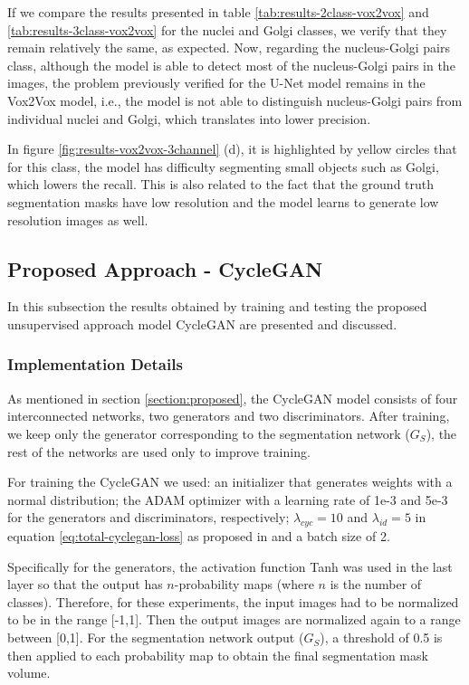 If we compare the results presented in table \ref{tab:results-2class-vox2vox} and \ref{tab:results-3class-vox2vox} for the nuclei and Golgi classes, we verify that they remain relatively the same, as expected. Now, regarding the nucleus-Golgi pairs class, although the model is able to detect most of the nucleus-Golgi pairs in the images, the problem previously verified for the U-Net model remains in the Vox2Vox model, i.e., the model is not able to distinguish nucleus-Golgi pairs from individual nuclei and Golgi, which translates into lower precision. 

In figure \ref{fig:results-vox2vox-3channel} (d), it is highlighted by yellow circles that for this class, the model has difficulty segmenting small objects such as Golgi, which lowers the recall. This is also related to the fact that the ground truth segmentation masks have low resolution and the model learns to generate low resolution images as well.


\subsection{Proposed Approach - CycleGAN}

In this subsection the results obtained by training and testing the proposed unsupervised approach model CycleGAN are presented and discussed.

\subsubsection*{Implementation Details}

As mentioned in section \ref{section:proposed}, the CycleGAN model consists of four interconnected networks, two generators and two discriminators. After training, we keep only the generator corresponding to the segmentation network ($G_S$), the rest of the networks are used only to improve training. 

For training the CycleGAN we used: an initializer that generates weights with a normal distribution; the ADAM optimizer with a learning rate of 1e-3 and 5e-3 for the generators and discriminators, respectively; $\lambda_{cyc} = 10$ and $\lambda_{id} = 5$ in equation \ref{eq:total-cyclegan-loss} as proposed in \cite{cycleGAN:original} and a batch size of 2.

Specifically for the generators, the activation function \ac{Tanh} was used in the last layer so that the output has $n$-probability maps (where $n$ is the number of classes). Therefore, for these experiments, the input images had to be normalized to be in the range [-1,1]. Then the output images are normalized again to a range between [0,1]. For the segmentation network output ($G_S$), a threshold of 0.5 is then applied to each probability map to obtain the final segmentation mask volume.

